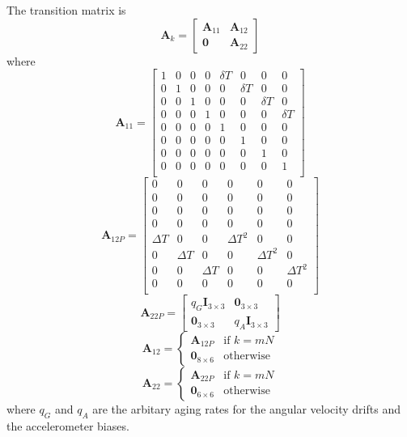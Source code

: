 \documentclass[a4paper]{report}
\numberwithin{equation}{chapter}
\newcommand{\mat}[1]{\boldsymbol{#1}}
\begin{document}
\bigskip

The transition matrix is
\begin{equation}
\mat{A}_k =
\begin{bmatrix}
\mat{A}_{11} & \mat{A}_{12}\\
\mat{0} & \mat{A}_{22}
\end{bmatrix}
\end{equation}
where
\begin{equation}
\mat{A}_{11} =
\begin{bmatrix}
1 & 0 & 0 & 0 & \delta T & 0 & 0 & 0\\
0 & 1 & 0 & 0 & 0 & \delta T & 0 & 0\\
0 & 0 & 1 & 0 & 0 & 0 & \delta T & 0\\
0 & 0 & 0 & 1 & 0 & 0 & 0 & \delta T\\
0 & 0 & 0 & 0 & 1 & 0 & 0 & 0\\
0 & 0 & 0 & 0 & 0 & 1 & 0 & 0\\
0 & 0 & 0 & 0 & 0 & 0 & 1 & 0\\
0 & 0 & 0 & 0 & 0 & 0 & 0 & 1\\
\end{bmatrix}
\end{equation}
\begin{equation}
\mat{A}_{12P} =
\begin{bmatrix}
0 & 0 & 0 & 0 & 0 & 0\\
0 & 0 & 0 & 0 & 0 & 0\\
0 & 0 & 0 & 0 & 0 & 0\\
0 & 0 & 0 & 0 & 0 & 0\\
\Delta T & 0 & 0 & \Delta T^2 & 0 & 0\\
0 & \Delta T & 0 & 0 & \Delta T^2 & 0\\
0 & 0 & \Delta T & 0 & 0 & \Delta T^2\\
0 & 0 & 0 & 0 & 0 & 0\\
\end{bmatrix}
\end{equation}
\begin{equation}
\mat{A}_{22P} =
\begin{bmatrix}
q_G \mat{I}_{3 \times 3} & \mat{0}_{3 \times 3}\\
\mat{0}_{3 \times 3} & q_A \mat{I}_{3 \times 3}
\end{bmatrix}
\end{equation}
\begin{equation}
\mat{A}_{12} =
\begin{cases}
\mat{A}_{12P} & \text{if $k = mN$}\\
\mat{0}_{8 \times 6} & \text{otherwise}
\end{cases}
\end{equation}
\begin{equation}
\mat{A}_{22} =
\begin{cases}
\mat{A}_{22P} & \text{if $k = mN$}\\
\mat{0}_{6 \times 6} & \text{otherwise}
\end{cases}
\end{equation}
where $q_G$ and $q_A$ are the arbitary aging rates for the angular velocity drifts and the accelerometer biases.
\end{document}
